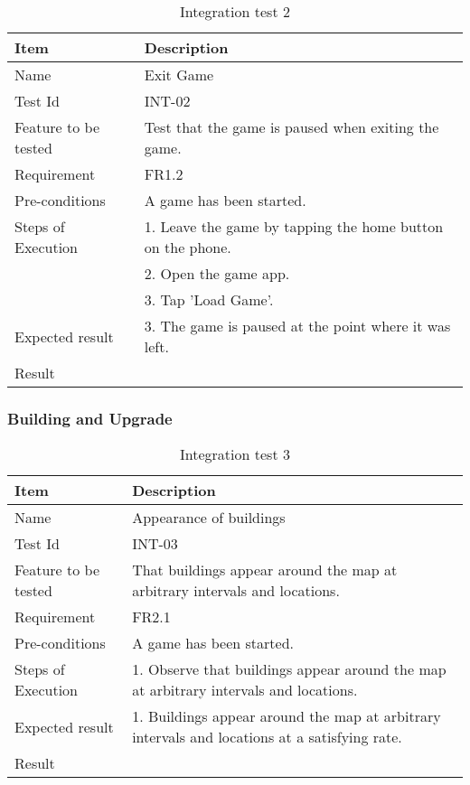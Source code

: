 \begin{table}[H]
\centering
	\begin{tabular}{ l | p{8cm} }
		\hline
		{\bf Item} & {\bf Description} \\ \hline
		Name & Exit Game \\ 
		Test Id & INT-02 \\ 
		Feature to be tested & Test that the game is paused when exiting the game. \\ 
		Requirement & FR1.2 \\ 
		Pre-conditions & A game has been started. \\ 
		Steps of Execution & 1. Leave the game by tapping the home button on the phone. \\
		& 2. Open the game app. \\
		& 3. Tap 'Load Game'. \\
		Expected result & 3. The game is paused at the point where it was left. \\ 
		Result & \\ 
	\end{tabular}
	\caption{Integration test 2}
\end{table}

\subsubsection{Building and Upgrade}

\begin{table}[H]
\centering
	\begin{tabular}{ l | p{8cm} }
		\hline
		{\bf Item} & {\bf Description} \\ \hline
		Name & Appearance of buildings \\ 
		Test Id & INT-03 \\ 
		Feature to be tested & That buildings appear around the map at arbitrary intervals and locations. \\ 
		Requirement & FR2.1 \\ 
		Pre-conditions & A game has been started. \\ 
		Steps of Execution & 1. Observe that buildings appear around the map at arbitrary intervals and locations.\\ 
		Expected result & 1. Buildings appear around the map at arbitrary intervals and locations at a satisfying rate.\\ 
		Result & \\ 
	\end{tabular}
	\caption{Integration test 3}
\end{table}

